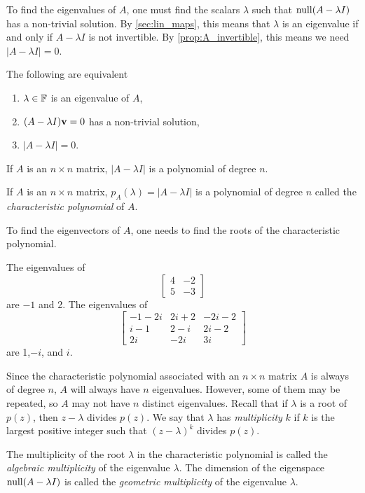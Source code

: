 \documentclass{article}
\begin{document}
To find the eigenvalues of $A$, one must find the scalars $\lambda$ such that $\operatorname{null} (A - \lambda I)$ has a non-trivial solution. By \cref{sec:lin_maps}, this means that $\lambda$ is an eigenvalue if and only if $A - \lambda I$ is not invertible. By \cref{prop:A_invertible}, this means we need $|A - \lambda I| = 0$.

\begin{theorem}
The following are equivalent
\begin{enumerate}
    \item $\lambda\in {\mathbb{F}}$ is an eigenvalue of $A$,
    \item $(A-\lambda I){\mathbf{v}} = 0$ has a non-trivial solution,
    \item $|A-\lambda I|= 0$.
\end{enumerate}
\end{theorem}

If $A$ is an $n \times n$ matrix, $|A - \lambda I|$ is a polynomial of degree $n$. 
\begin{definition}
If $A$ is an $n\times n$ matrix, $p_A(\lambda) = |A-\lambda I|$ is a polynomial of degree $n$ called the \emph{characteristic polynomial} of $A$.
\end{definition}

To find the eigenvectors of $A$, one needs to find the roots of the characteristic polynomial.

\begin{example}
The eigenvalues of 
$$ \begin{bmatrix} 4 & -2 \\ 5 & -3 \end{bmatrix}$$
are $-1$ and 2.
The eigenvalues of 
$$ \begin{bmatrix} -1-2i & 2i+2 &-2i-2\\ i-1 & 2-i &2i-2\\ 2i &-2i & 3i \end{bmatrix}$$
are 1,$-i$, and $i$.
\end{example}

Since the characteristic polynomial associated with an $n \times n$ matrix $A$ is always of degree $n$, $A$ will always have $n$ eigenvalues. However, some of them may be repeated, so $A$ may not have $n$ distinct eigenvalues. 
Recall that if $\lambda$ is a root of $p(z)$, then $z - \lambda$ divides $p(z)$. We say that $\lambda$ has \emph{multiplicity} $k$ if $k$ is the largest positive integer such that $(z - \lambda)^k$ divides $p(z)$. 

\begin{definition}
The multiplicity of the root $\lambda$ in the characteristic polynomial is called the \emph{algebraic multiplicity} of the eigenvalue $\lambda$. The dimension of the eigenspace $\operatorname{null} (A - \lambda I)$ is called the \emph{geometric multiplicity} of the eigenvalue $\lambda$.
\end{definition}
\end{document}
